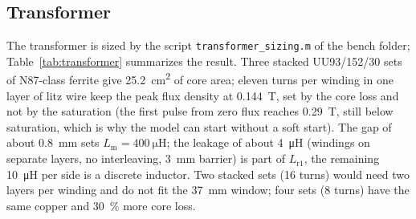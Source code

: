 \documentclass[12pt,a4paper]{scrartcl}
\newcommand{\ped}[1]{_{\mathrm{#1}}}
\newcommand{\code}[1]{\texttt{#1}}
\begin{document}
\begin{onehalfspace}
\subsection{Transformer}
\label{sec:transformer}

The transformer is sized by the script \code{transformer\_sizing.m} of the bench folder; Table~\ref{tab:transformer} summarizes the result. Three stacked UU93/152/30 sets of N87-class ferrite give \SI{25.2}{\square\centi\metre} of core area; eleven turns per winding in one layer of litz wire keep the peak flux density at \SI{0.144}{\tesla}, set by the core loss and not by the saturation (the first pulse from zero flux reaches \SI{0.29}{\tesla}, still below saturation, which is why the model can start without a soft start). The gap of about \SI{0.8}{\milli\metre} sets $L\ped{m} = \SI{400}{\micro\henry}$; the leakage of about \SI{4}{\micro\henry} (windings on separate layers, no interleaving, \SI{3}{\milli\metre} barrier) is part of $L\ped{r1}$, the remaining \SI{10}{\micro\henry} per side is a discrete inductor. Two stacked sets (16 turns) would need two layers per winding and do not fit the \SI{37}{\milli\metre} window; four sets (8 turns) have the same copper and \SI{30}{\percent} more core loss.


\end{onehalfspace}
\end{document}
